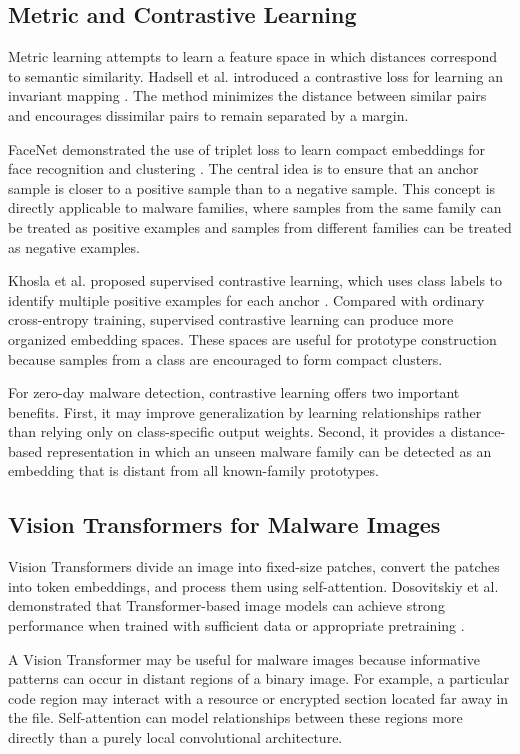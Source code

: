 \documentclass[12pt,a4paper]{article}
\begin{document}
\subsection{Metric and Contrastive Learning}

Metric learning attempts to learn a feature space in which distances correspond to semantic similarity. Hadsell et al. introduced a contrastive loss for learning an invariant mapping \citep{hadsell2006}. The method minimizes the distance between similar pairs and encourages dissimilar pairs to remain separated by a margin.

FaceNet demonstrated the use of triplet loss to learn compact embeddings for face recognition and clustering \citep{schroff2015}. The central idea is to ensure that an anchor sample is closer to a positive sample than to a negative sample. This concept is directly applicable to malware families, where samples from the same family can be treated as positive examples and samples from different families can be treated as negative examples.

Khosla et al. proposed supervised contrastive learning, which uses class labels to identify multiple positive examples for each anchor \citep{khosla2020}. Compared with ordinary cross-entropy training, supervised contrastive learning can produce more organized embedding spaces. These spaces are useful for prototype construction because samples from a class are encouraged to form compact clusters.

For zero-day malware detection, contrastive learning offers two important benefits. First, it may improve generalization by learning relationships rather than relying only on class-specific output weights. Second, it provides a distance-based representation in which an unseen malware family can be detected as an embedding that is distant from all known-family prototypes.

\subsection{Vision Transformers for Malware Images}

Vision Transformers divide an image into fixed-size patches, convert the patches into token embeddings, and process them using self-attention. Dosovitskiy et al. demonstrated that Transformer-based image models can achieve strong performance when trained with sufficient data or appropriate pretraining \citep{dosovitskiy2020}.

A Vision Transformer may be useful for malware images because informative patterns can occur in distant regions of a binary image. For example, a particular code region may interact with a resource or encrypted section located far away in the file. Self-attention can model relationships between these regions more directly than a purely local convolutional architecture.
\end{document}
